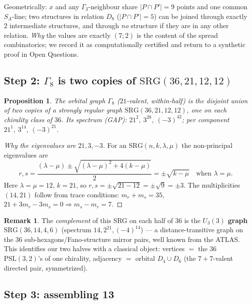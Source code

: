 \documentclass[11pt]{article}
\newtheorem{proposition}[theorem]{Proposition}
\theoremstyle{definition}
\newtheorem{remark}[theorem]{Remark}
\newcommand{\PSL}{\mathrm{PSL}}
\begin{document}
Geometrically: $x$ and any $\Gamma_3$-neighbour share $|P\cap P'| = 9$
points and one common $S_A$-line; two structures in relation $D_8$
($|P\cap P'| = 5$) can be joined through exactly $2$ intermediate
structures, and through \emph{no} structure if they are in any other
relation. \emph{Why} the values are exactly $(7;2)$ is the content of the
spread combinatorics; we record it as computationally certified and return
to a synthetic proof in Open Questions.

\subsection{Step 2: $\Gamma_8$ is two copies of $\mathrm{SRG}(36,21,12,12)$}

\begin{proposition}\label{prop:srg}
The orbital graph $\Gamma_8$ ($21$-valent, within-half) is the disjoint
union of two copies of a strongly regular graph
$\mathrm{SRG}(36,21,12,12)$, one on each chirality class of $36$. Its
spectrum (GAP): $21^2,\ 3^{28},\ (-3)^{42}$; per component
$21^1,\ 3^{14},\ (-3)^{21}$.
\end{proposition}

\begin{proof}[Why the eigenvalues are $21, 3, -3$]
For an $\mathrm{SRG}(n,k,\lambda,\mu)$ the non-principal eigenvalues are
\[
r,s = \frac{(\lambda-\mu) \pm \sqrt{(\lambda-\mu)^2 + 4(k-\mu)}}{2}
= \pm\sqrt{k-\mu} \quad\text{when } \lambda = \mu .
\]
Here $\lambda = \mu = 12$, $k = 21$, so $r,s = \pm\sqrt{21-12} =
\pm\sqrt{9} = \pm 3$. The multiplicities $(14,21)$ follow from trace
conditions: $m_r + m_s = 35$, $21 + 3m_r - 3m_s = 0 \Rightarrow
m_s - m_r = 7$.
\end{proof}

\begin{remark}
The \emph{complement} of this SRG on each half of $36$ is the
\textbf{$U_3(3)$ graph} $\mathrm{SRG}(36,14,4,6)$ (spectrum
$14, 2^{21}, (-4)^{14}$) --- a distance-transitive graph on the $36$
sub-hexagons/Fano-structure mirror pairs, well known from the ATLAS. This
identifies our two halves with a classical object: vertices $=$ the $36$
$\PSL(3,2)$'s of one chirality, adjacency $=$ orbital $D_4\cup D_6$
(the $7{+}7$-valent directed pair, symmetrized).
\end{remark}

\subsection{Step 3: assembling 13}
\end{document}
